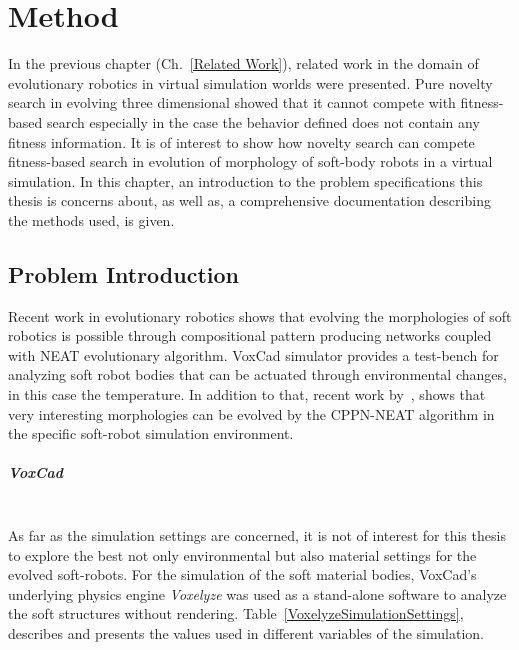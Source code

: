 
\chapter{Method} %

\label{Method} %


In the previous chapter (Ch.~\ref{Related Work}), related work in the domain of evolutionary robotics in virtual simulation worlds were presented. Pure novelty search in evolving three dimensional showed that it cannot compete with fitness-based search especially in the case the behavior defined does not contain any fitness information. It is of interest to show how novelty search can compete fitness-based search in evolution of morphology of soft-body robots in a virtual simulation. In this chapter, an introduction to the problem specifications this thesis is concerns about, as well as, a comprehensive documentation describing the methods used, is given.


\section{Problem Introduction}

Recent work in evolutionary robotics shows that evolving the morphologies of soft robotics is possible through compositional pattern producing networks coupled with NEAT evolutionary algorithm. VoxCad simulator provides a test-bench for analyzing soft robot bodies that can be actuated through environmental changes, in this case the temperature. In addition to that, recent work by~\cite{cheney2013unshackling}, shows that very interesting morphologies can be evolved by the CPPN-NEAT algorithm in the specific soft-robot simulation environment.

\paragraph*{VoxCad}~\\
As far as the simulation settings are concerned, it is not of interest for this thesis to explore the best not only environmental but also material settings for the evolved soft-robots. For the simulation of the soft material bodies, VoxCad's underlying physics engine \emph{Voxelyze} was used as a stand-alone software to analyze the soft structures without rendering. Table~\ref{VoxelyzeSimulationSettings}, describes and presents the values used in different variables of the simulation.



